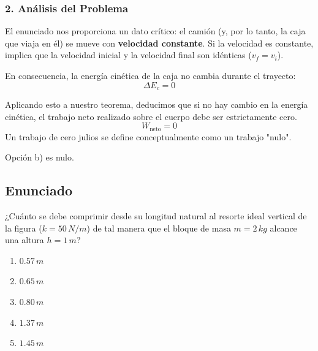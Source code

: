 \documentclass[12pt, a4paper]{article}
\begin{document}
\subsubsection*{2. Análisis del Problema}
El enunciado nos proporciona un dato crítico: el camión (y, por lo tanto, la caja que viaja en él) se mueve con \textbf{velocidad constante}.
Si la velocidad es constante, implica que la velocidad inicial y la velocidad final son idénticas ($v_f = v_i$).

En consecuencia, la energía cinética de la caja no cambia durante el trayecto:
$$ \Delta E_c = 0 $$

Aplicando esto a nuestro teorema, deducimos que si no hay cambio en la energía cinética, el trabajo neto realizado sobre el cuerpo debe ser estrictamente cero.
$$ W_{\text{neto}} = 0 $$
Un trabajo de cero julios se define conceptualmente como un trabajo "nulo".

\begin{tcolorbox}[colback=green!5!white, colframe=green!50!black, title=Respuesta Final]
\centering Opción b) es nulo.
\end{tcolorbox}

\newpage

\subsection*{Enunciado}
¿Cuánto se debe comprimir desde su longitud natural al resorte ideal vertical de la figura ($k = 50 \, \si{N/m}$) de tal manera que el bloque de masa $m = 2 \, \si{kg}$ alcance una altura $h = 1 \, \si{m}$?
\begin{enumerate}[label=\alph*)]
    \item $0.57 \, \si{m}$
    \item $0.65 \, \si{m}$
    \item $0.80 \, \si{m}$
    \item $1.37 \, \si{m}$
    \item $1.45 \, \si{m}$
\end{enumerate}

\begin{center}
\end{center}
\end{document}
